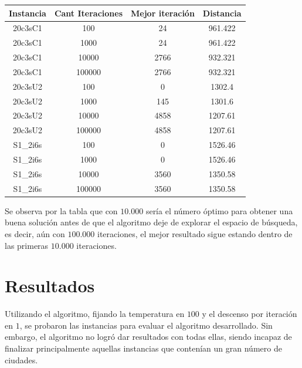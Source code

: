 \documentclass[letter, 10pt]{article}
\begin{document}
\begin{itemize}
\begin{center}
\begin{tabular}{|c|c|c|c|}
	\hline
	Instancia & Cant Iteraciones & Mejor iteración & Distancia\\
	\hline
	20c3sC1 	& 100  	 & 24 	& 961.422\\
	20c3sC1		& 1000   & 24 	& 961.422\\
	20c3sC1		& 10000  & 2766 & 932.321\\
	20c3sC1		& 100000 & 2766 & 932.321\\	
	\hline
	20c3sU2 	& 100    & 0	& 1302.4\\
	20c3sU2		& 1000   & 145	& 1301.6\\ 
	20c3sU2		& 10000  & 4858	& 1207.61\\
	20c3sU2		& 100000 & 4858	& 1207.61\\
	\hline
	S1\_2i6s 	& 100    & 0 	& 1526.46\\
	S1\_2i6s 	& 1000   & 0	& 1526.46\\
	S1\_2i6s 	& 10000  & 3560	& 1350.58\\
	S1\_2i6s 	& 100000 & 3560	& 1350.58\\
	\hline
\end{tabular}
\end{center}

Se observa por la tabla que con $10.000$ sería el número óptimo para obtener una buena solución antes de que el algoritmo deje de explorar el espacio de búsqueda, es decir, aún con $100.000$ iteraciones, el mejor resultado sigue estando dentro de las primeras $10.000$ iteraciones.

\end{itemize}

\section{Resultados}

Utilizando el algoritmo, fijando la temperatura en $100$ y el descenso por iteración en $1$, se probaron las instancias para evaluar el algoritmo desarrollado. Sin embargo, el algoritmo no logró dar resultados con todas ellas, siendo incapaz de finalizar principalmente aquellas instancias que contenían un gran número de ciudades.
\end{document}
